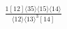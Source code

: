 \documentclass[varwidth, border=5pt]{standalone}
\begin{document}
\begin{my}
$\begin{gathered}
\scriptscriptstyle\frac{1[12]⟨35⟩⟨15⟩⟨14⟩}{⟨12⟩⟨13⟩^3[14]}
\end{gathered}$
\end{my}
\end{document}
